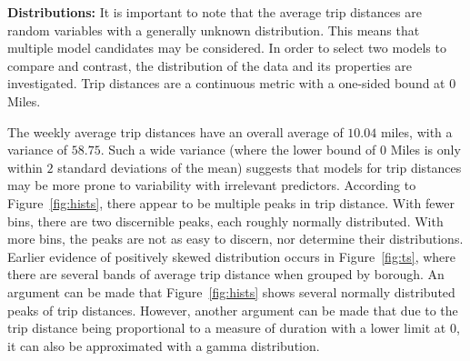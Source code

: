 \documentclass[11pt]{article}
\begin{document}
    

\begin{multicols}{2}
    \textbf{Distributions:} 
It is important to note that the average trip distances
are random variables with a generally unknown distribution.
This means that multiple model candidates may be considered.
In order to select two models to compare and contrast, the distribution of the data
and its properties are investigated.
Trip distances are a continuous metric with a one-sided bound at 0 Miles.

The weekly average trip distances have an overall average of $10.04$ miles, with a variance of $58.75$.
Such a wide variance (where the lower bound of $0$ Miles is only within $2$ standard deviations of the mean) 
suggests that models for trip distances may be more prone to variability with irrelevant predictors.
According to Figure~\ref{fig:hists}, there appear to be multiple peaks in trip distance. 
With fewer bins, there are two discernible peaks, each roughly normally distributed.
With more bins, the peaks are not as easy to discern, nor determine their distributions.
Earlier evidence of positively skewed distribution occurs in Figure~\ref{fig:ts}, 
where there are several bands of average trip distance when grouped by borough.
An argument can be made that Figure~\ref{fig:hists} shows several normally distributed peaks of trip distances.
However, another argument can be made that due to the trip distance being proportional to a measure of duration
with a lower limit at $0$, it can also be approximated with a gamma distribution.


\end{multicols}
\end{document}
